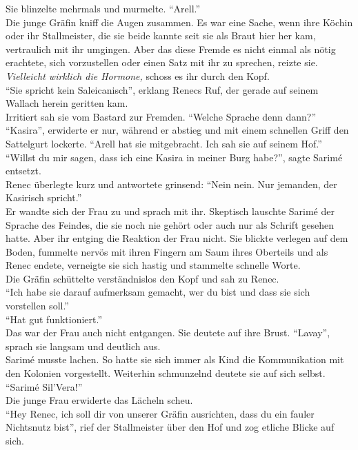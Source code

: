Sie blinzelte mehrmals und murmelte. ``Arell.''\\
Die junge Gräfin kniff die Augen zusammen. Es war eine Sache, wenn ihre Köchin oder ihr 
Stallmeister, die sie beide kannte seit sie als Braut hier her kam, vertraulich mit ihr umgingen. 
Aber das diese Fremde es nicht einmal als nötig erachtete, sich vorzustellen oder einen Satz mit 
ihr zu sprechen, reizte sie. \textit{Vielleicht wirklich die Hormone,} schoss es ihr durch den 
Kopf.\\
``Sie spricht kein Saleicanisch'', erklang Renecs Ruf, der gerade auf seinem Wallach herein 
geritten kam.\\
Irritiert sah sie vom Bastard zur Fremden. ``Welche Sprache denn dann?''\\
``Kasira'', erwiderte er nur, während er abstieg und mit einem schnellen Griff den Sattelgurt 
lockerte. ``Arell hat sie mitgebracht. Ich sah sie auf seinem Hof.''\\
``Willst du mir sagen, dass ich eine Kasira in meiner Burg habe?'', sagte Sarimé entsetzt.\\
Renec überlegte kurz und antwortete grinsend: ``Nein nein. Nur jemanden, der Kasirisch spricht.''\\
Er wandte sich der Frau zu und sprach mit ihr. Skeptisch lauschte Sarimé der Sprache des Feindes, 
die sie noch nie gehört oder auch nur als Schrift gesehen hatte. Aber ihr entging die Reaktion der 
Frau nicht. Sie blickte verlegen auf dem Boden, fummelte nervös mit ihren Fingern am Saum ihres 
Oberteils und als Renec endete, verneigte sie sich hastig und stammelte schnelle Worte.\\
Die Gräfin schüttelte verständnislos den Kopf und sah zu Renec.\\
``Ich habe sie darauf aufmerksam gemacht, wer du bist und dass sie sich vorstellen soll.''\\
``Hat gut funktioniert.''\\
Das war der Frau auch nicht entgangen. Sie deutete auf ihre Brust. ``Lavay'', sprach sie langsam 
und deutlich aus.\\
Sarimé musste lachen. So hatte sie sich immer als Kind die Kommunikation mit den Kolonien 
vorgestellt. Weiterhin schmunzelnd deutete sie auf sich selbst. ``Sarimé Sil'Vera!''\\
Die junge Frau erwiderte das Lächeln scheu.\\
``Hey Renec, ich soll dir von unserer Gräfin ausrichten, dass du ein fauler Nichtsnutz bist'', rief 
der Stallmeister über den Hof und zog etliche Blicke auf sich.\\
